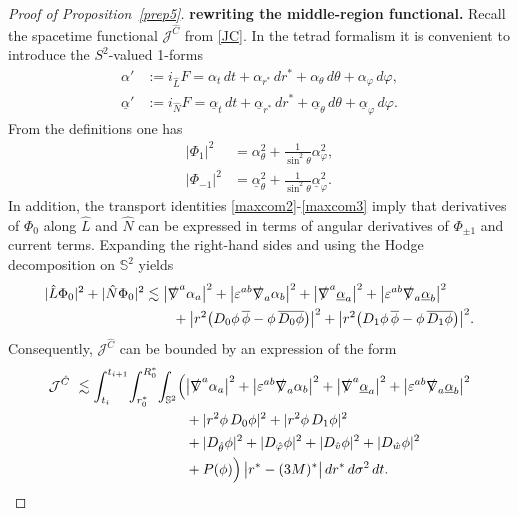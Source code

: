 \documentclass[11pt]{article}
\numberwithin{equation}{section}
\theoremstyle{plain}
\theoremstyle{definition}
\theoremstyle{remark}
\begin{document}
\begin{proof}[Proof of Proposition~\ref{prep5}]
\medskip
\noindent\textbf{rewriting the middle-region functional.}
Recall the spacetime functional $\mathcal J^{\hat C}$ from \eqref{JC}.
In the tetrad formalism it is convenient to introduce the $S^{2}$-valued 1-forms
\begin{eqnarray}\label{eq:np-forms-alpha}
\alpha'
&:=
i_{\hat L}F
=
\alpha_{t}\,dt+\alpha_{r^{\ast}}\,dr^{\ast}+\alpha_{\theta}\,d\theta+\alpha_{\varphi}\,d\varphi,
\nonumber\\
\underline{\alpha}'
&:=
i_{\hat N}F
=
\underline{\alpha}_{t}\,dt+\underline{\alpha}_{r^{\ast}}\,dr^{\ast}+\underline{\alpha}_{\theta}\,d\theta+\underline{\alpha}_{\varphi}\,d\varphi.
\end{eqnarray}
From the definitions one has
\begin{eqnarray}
|\Phi_{1}|^{2}&=\alpha_{\theta}^{2}+\frac{1}{\sin^{2}\theta}\alpha_{\varphi}^{2},\\
|\Phi_{-1}|^{2}&=\underline{\alpha}_{\theta}^{2}+\frac{1}{\sin^{2}\theta}\underline{\alpha}_{\varphi}^{2}.
\end{eqnarray}
In addition, the transport identities \eqref{maxcom2}-\eqref{maxcom3} imply that derivatives of $\Phi_{0}$ along $\hat L$ and $\hat N$
can be expressed in terms of angular derivatives of $\Phi_{\pm 1}$ and current terms.
Expanding the right-hand sides and using the Hodge decomposition on $\mathbb S^{2}$ yields
\begin{eqnarray}
|\hat L\Phi_{0}|^{2}+|\hat N\Phi_{0}|^{2}
&\lesssim
\bigl|\slashed\nabla^{a}\alpha_{a}\bigr|^{2}
+\bigl|\varepsilon^{ab}\slashed\nabla_{a}\alpha_{b}\bigr|^{2}
+\bigl|\slashed\nabla^{a}\underline{\alpha}_{a}\bigr|^{2}
+\bigl|\varepsilon^{ab}\slashed\nabla_{a}\underline{\alpha}_{b}\bigr|^{2}
\\
&\qquad
+\bigl|r^{2}\bigl(D_{0}\phi\,\overline{\phi}-\phi\,\overline{D_{0}\phi}\bigr)\bigr|^{2}
+\bigl|r^{2}\bigl(D_{1}\phi\,\overline{\phi}-\phi\,\overline{D_{1}\phi}\bigr)\bigr|^{2}.
\end{eqnarray}
Consequently, $\mathcal J^{\hat C}$ can be bounded by an expression of the form
\begin{eqnarray}\label{JGtetrad}
\mathcal{J}^{\hat{C}}
\ \lesssim
\int_{t_i}^{t_{i+1}}\!\int_{r_{0}^{\ast}}^{R_{0}^{\ast}}\!\int_{\mathbb S^{2}}
\Bigl(
&\bigl|\slashed\nabla^{a}\alpha_{a}\bigr|^{2}
+\bigl|\varepsilon^{ab}\slashed\nabla_{a}\alpha_{b}\bigr|^{2}
+\bigl|\slashed\nabla^{a}\underline{\alpha}_{a}\bigr|^{2}
+\bigl|\varepsilon^{ab}\slashed\nabla_{a}\underline{\alpha}_{b}\bigr|^{2}
\nonumber\\
&+|r^{2}\phi\,D_{0}\phi|^{2}+|r^{2}\phi\,D_{1}\phi|^{2}
\nonumber\\
&+|D_{\hat\theta}\phi|^{2}+|D_{\hat\varphi}\phi|^{2}
+|D_{\hat v}\phi|^{2}+|D_{\hat w}\phi|^{2}
\nonumber\\
&+P(\phi)
\Bigr)\,\bigl|r^{\ast}-(3M)^{\ast}\bigr|\,dr^{\ast}\,d\sigma^{2}\,dt.
\end{eqnarray}


\end{proof}
\end{document}
